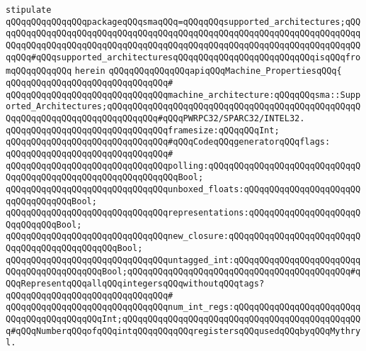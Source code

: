 \verb|stipulate|\newline
\verb|qQQqqQQqqQQqqQQqpackageqQQqsmaqQQq=qQQqqQQqsupported_architectures;qQQqqQQqqQQqqQQqqQQqqQQqqQQqqQQqqQQqqQQqqQQqqQQqqQQqqQQqqQQqqQQqqQQqqQQqqQQqqQQqqQQqqQQqqQQqqQQqqQQqqQQqqQQqqQQqqQQqqQQqqQQqqQQqqQQqqQQqqQQqqQQqqQQq#qQQqsupported_architecturesqQQqqQQqqQQqqQQqqQQqqQQqqQQqisqQQqfromqQQqqQQqqQQq|\newline
\verb|herein|\newline
\verb|qQQqqQQqqQQqqQQqapiqQQqMachine_PropertiesqQQq{|\newline
\verb|qQQqqQQqqQQqqQQqqQQqqQQqqQQqqQQq#|\newline
\verb|qQQqqQQqqQQqqQQqqQQqqQQqqQQqqQQqmachine_architecture:qQQqqQQqsma::Supported_Architectures;qQQqqQQqqQQqqQQqqQQqqQQqqQQqqQQqqQQqqQQqqQQqqQQqqQQqqQQqqQQqqQQqqQQqqQQqqQQqqQQq#qQQqPWRPC32/SPARC32/INTEL32.|\newline
\newline
\verb|qQQqqQQqqQQqqQQqqQQqqQQqqQQqqQQqframesize:qQQqqQQqInt;|\newline
\newline
\verb|qQQqqQQqqQQqqQQqqQQqqQQqqQQqqQQq#qQQqCodeqQQqgeneratorqQQqflags:|\newline
\verb|qQQqqQQqqQQqqQQqqQQqqQQqqQQqqQQq#|\newline
\verb|qQQqqQQqqQQqqQQqqQQqqQQqqQQqqQQqpolling:qQQqqQQqqQQqqQQqqQQqqQQqqQQqqQQqqQQqqQQqqQQqqQQqqQQqqQQqqQQqqQQqBool;|\newline
\verb|qQQqqQQqqQQqqQQqqQQqqQQqqQQqqQQqunboxed_floats:qQQqqQQqqQQqqQQqqQQqqQQqqQQqqQQqqQQqBool;|\newline
\verb|qQQqqQQqqQQqqQQqqQQqqQQqqQQqqQQqrepresentations:qQQqqQQqqQQqqQQqqQQqqQQqqQQqqQQqBool;|\newline
\verb|qQQqqQQqqQQqqQQqqQQqqQQqqQQqqQQqnew_closure:qQQqqQQqqQQqqQQqqQQqqQQqqQQqqQQqqQQqqQQqqQQqqQQqBool;|\newline
\verb|qQQqqQQqqQQqqQQqqQQqqQQqqQQqqQQquntagged_int:qQQqqQQqqQQqqQQqqQQqqQQqqQQqqQQqqQQqqQQqqQQqBool;qQQqqQQqqQQqqQQqqQQqqQQqqQQqqQQqqQQqqQQqqQQq#qQQqRepresentqQQqallqQQqintegersqQQqwithoutqQQqtags?|\newline
\verb|qQQqqQQqqQQqqQQqqQQqqQQqqQQqqQQq#|\newline
\verb|qQQqqQQqqQQqqQQqqQQqqQQqqQQqqQQqnum_int_regs:qQQqqQQqqQQqqQQqqQQqqQQqqQQqqQQqqQQqqQQqqQQqInt;qQQqqQQqqQQqqQQqqQQqqQQqqQQqqQQqqQQqqQQqqQQqqQQq#qQQqNumberqQQqofqQQqintqQQqqQQqqQQqregistersqQQqusedqQQqbyqQQqMythryl.|\newline
